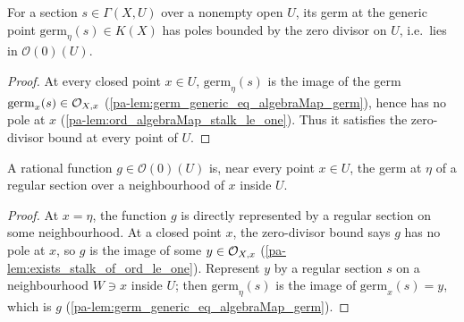 \begin{lemma}
  \label{pa-lem:germGenericLinear_mem}
  \leanok

  For a section \(s \in \Gamma(X, U)\) over a nonempty open \(U\), its germ at the generic point
  \(\mathrm{germ}_\eta(s) \in K(X)\) has poles bounded by the zero divisor on \(U\), i.e.\ lies in
  \(\mathcal O(0)(U)\).
\end{lemma}
\begin{proof}
  \leanok
  At every closed point \(x \in U\), \(\mathrm{germ}_\eta(s)\) is the image of the germ
  \(\mathrm{germ}_x(s) \in \mathcal{O}_{X,x}\) (\ref{pa-lem:germ_generic_eq_algebraMap_germ}), hence has no
  pole at \(x\) (\ref{pa-lem:ord_algebraMap_stalk_le_one}). Thus it satisfies the zero-divisor bound at
  every point of \(U\).
\end{proof}

\begin{lemma}
  \label{pa-lem:exists_local_section}
  \leanok

  A rational function \(g \in \mathcal O(0)(U)\) is, near every point \(x \in U\), the germ at
  \(\eta\) of a regular section over a neighbourhood of \(x\) inside \(U\).
\end{lemma}
\begin{proof}
  \leanok
  At \(x = \eta\), the function \(g\) is directly represented by a regular section on some
  neighbourhood. At a closed point \(x\), the zero-divisor bound says \(g\) has no pole at \(x\), so
  \(g\) is the image of some \(y \in \mathcal{O}_{X,x}\) (\ref{pa-lem:exists_stalk_of_ord_le_one}). Represent
  \(y\) by a regular section \(s\) on a neighbourhood \(W \ni x\) inside \(U\); then
  \(\mathrm{germ}_\eta(s)\) is the image of \(\mathrm{germ}_x(s) = y\), which is \(g\)
  (\ref{pa-lem:germ_generic_eq_algebraMap_germ}).
\end{proof}

